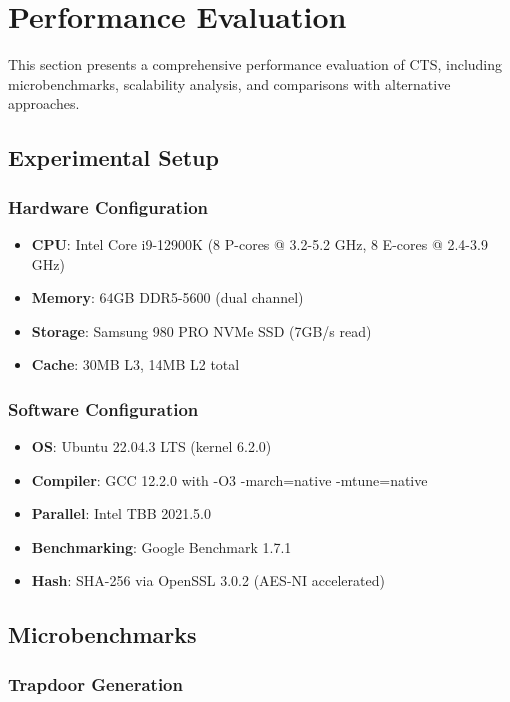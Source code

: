 \documentclass[../main_comprehensive.tex]{subfiles}
\begin{document}
\section{Performance Evaluation}
\label{sec:performance}

This section presents a comprehensive performance evaluation of CTS, including microbenchmarks, scalability analysis, and comparisons with alternative approaches.

\subsection{Experimental Setup}

\subsubsection{Hardware Configuration}
\begin{itemize}
\item \textbf{CPU}: Intel Core i9-12900K (8 P-cores @ 3.2-5.2 GHz, 8 E-cores @ 2.4-3.9 GHz)
\item \textbf{Memory}: 64GB DDR5-5600 (dual channel)
\item \textbf{Storage}: Samsung 980 PRO NVMe SSD (7GB/s read)
\item \textbf{Cache}: 30MB L3, 14MB L2 total
\end{itemize}

\subsubsection{Software Configuration}
\begin{itemize}
\item \textbf{OS}: Ubuntu 22.04.3 LTS (kernel 6.2.0)
\item \textbf{Compiler}: GCC 12.2.0 with -O3 -march=native -mtune=native
\item \textbf{Parallel}: Intel TBB 2021.5.0
\item \textbf{Benchmarking}: Google Benchmark 1.7.1
\item \textbf{Hash}: SHA-256 via OpenSSL 3.0.2 (AES-NI accelerated)
\end{itemize}

\subsection{Microbenchmarks}

\subsubsection{Trapdoor Generation}
\end{document}
